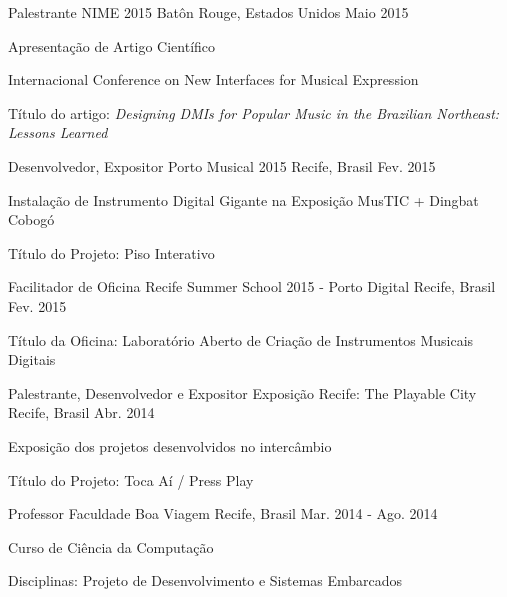 \begin{cventries}
\cventry
	{Palestrante}
	{NIME 2015}
	{Batôn Rouge, Estados Unidos}
	{Maio 2015}
	{\begin{cvitems}
		\item{Apresentação de Artigo Científico}
		\item{Internacional Conference on New Interfaces for Musical Expression}
		\item{Título do artigo: \textit{Designing DMIs for Popular Music in the Brazilian Northeast: Lessons Learned}}
	\end{cvitems}}

\cventry
	{Desenvolvedor, Expositor}
	{Porto Musical 2015}
	{Recife, Brasil}
	{Fev. 2015}
	{\begin{cvitems}
		\item{Instalação de Instrumento Digital Gigante na Exposição MusTIC + Dingbat Cobogó}
		\item{Título do Projeto: Piso Interativo}
	\end{cvitems}}

\cventry
	{Facilitador de Oficina}
	{Recife Summer School 2015 - Porto Digital}
	{Recife, Brasil}
	{Fev. 2015}
	{\begin{cvitems}
		\item{Título da Oficina: Laboratório Aberto de Criação de Instrumentos Musicais Digitais}
	\end{cvitems}}

\cventry
	{Palestrante, Desenvolvedor e Expositor}
	{Exposição Recife: The Playable City}
	{Recife, Brasil}
	{Abr. 2014}
	{\begin{cvitems}
		\item{Exposição dos projetos desenvolvidos no intercâmbio}
		\item{Título do Projeto: Toca Aí / Press Play}
	\end{cvitems}}

\cventry
	{Professor}
	{Faculdade Boa Viagem}
	{Recife, Brasil}
	{Mar. 2014 - Ago. 2014}
	{\begin{cvitems}
		\item{Curso de Ciência da Computação}
		\item{Disciplinas: Projeto de Desenvolvimento e Sistemas Embarcados}
	\end{cvitems}}


\end{cventries}
